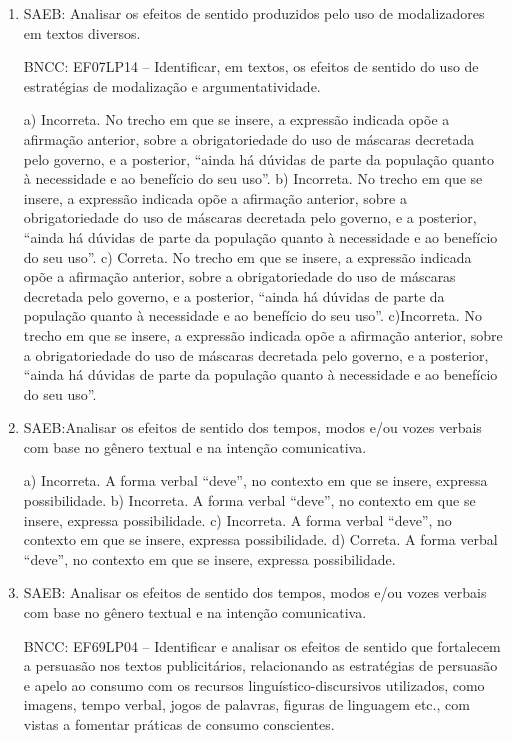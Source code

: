 \begin{enumerate}

\item
SAEB: Analisar os efeitos de sentido produzidos pelo uso de modalizadores em textos diversos.

BNCC: EF07LP14 -- Identificar, em textos, os efeitos de sentido do
uso de estratégias de modalização e argumentatividade.

a) Incorreta. No trecho em que se insere, a expressão indicada opõe a afirmação anterior, sobre
a obrigatoriedade do uso de máscaras decretada pelo governo, e a posterior, ``ainda há dúvidas 
de parte da população quanto à necessidade e ao benefício do seu uso''. 
b) Incorreta. No trecho em que se insere, a expressão indicada opõe a afirmação anterior, sobre
a obrigatoriedade do uso de máscaras decretada pelo governo, e a posterior, ``ainda há dúvidas 
de parte da população quanto à necessidade e ao benefício do seu uso''.
c) Correta. No trecho em que se insere, a expressão indicada opõe a afirmação anterior, sobre
a obrigatoriedade do uso de máscaras decretada pelo governo, e a posterior, ``ainda há dúvidas 
de parte da população quanto à necessidade e ao benefício do seu uso''.
c)Incorreta. No trecho em que se insere, a expressão indicada opõe a afirmação anterior, sobre
a obrigatoriedade do uso de máscaras decretada pelo governo, e a posterior, ``ainda há dúvidas 
de parte da população quanto à necessidade e ao benefício do seu uso''.

\item
SAEB:Analisar os efeitos de sentido dos tempos, modos e/ou vozes verbais
com base no gênero textual e na intenção comunicativa.

a) Incorreta. A forma verbal ``deve'', no contexto em que se insere, expressa possibilidade.
b) Incorreta. A forma verbal ``deve'', no contexto em que se insere, expressa possibilidade.
c) Incorreta. A forma verbal ``deve'', no contexto em que se insere, expressa possibilidade.
d) Correta. A forma verbal ``deve'', no contexto em que se insere, expressa possibilidade.

\item
SAEB: Analisar os efeitos de sentido dos tempos, modos e/ou vozes
verbais com base no gênero textual e na intenção comunicativa.

BNCC: EF69LP04 -- Identificar e analisar os efeitos de sentido
que fortalecem a persuasão nos textos publicitários, relacionando as
estratégias de persuasão e apelo ao consumo com os recursos
linguístico-discursivos utilizados, como imagens, tempo verbal, jogos de
palavras, figuras de linguagem etc., com vistas a fomentar práticas de
consumo conscientes.


\end{enumerate}
